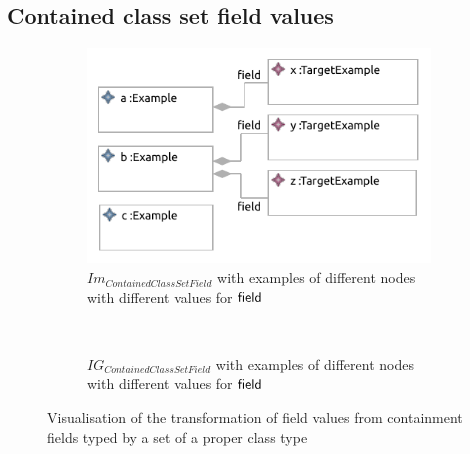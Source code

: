 \subsection{Contained class set field values}
\label{subsec:library_of_transformations:instance_level_transformations:contained_class_set_field_values}

\begin{figure}
    \centering
    \begin{subfigure}{0.95\textwidth}
        \centering
        \includegraphics{images/05_library_of_transformations/03_instance_level_transformations/10_contained_class_set_field_values/contained_class_set_field_value.pdf}
        \caption{$Im_{ContainedClassSetField}$ with examples of different nodes with different values for $\mathsf{field}$}
        \label{fig:library_of_transformations:instance_level_transformations:contained_class_set_field_values:visualisation:ecore}
    \end{subfigure}
    \\
    \begin{subfigure}{0.95\textwidth}
        \centering
        
        \caption{$IG_{ContainedClassSetField}$ with examples of different nodes with different values for $\mathsf{field}$}
        \label{fig:library_of_transformations:instance_level_transformations:contained_class_set_field_values:visualisation:groove}
    \end{subfigure}
    \caption{Visualisation of the transformation of field values from containment fields typed by a set of a proper class type}
    \label{fig:library_of_transformations:instance_level_transformations:contained_class_set_field_values:visualisation}
\end{figure}

